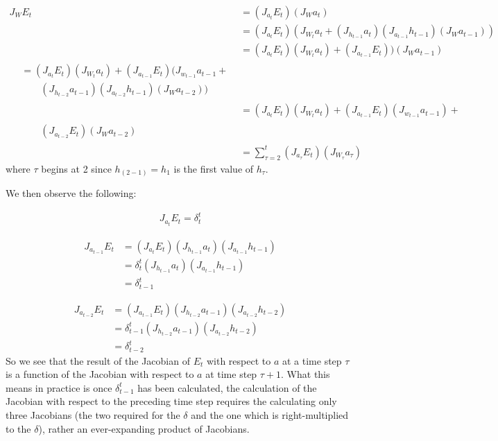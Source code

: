 \begin{align*}
  J_{W} E_t & = (J_{a_t} E_t)(J_{W} a_t) \\
  & = (J_{a_t} E_t)(J_{W_t} a_t + (J_{h_{t-1}} a_t)(J_{a_{t-1}} h_{t-1})(J_{W}a_{t-1})) \\
  & = (J_{a_t} E_t)(J_{W_t} a_t) + (J_{a_{t-1}} E_t))(J_{W}a_{t-1}) \\
  \begin{split}
    & = (J_{a_t} E_t)(J_{W_t} a_t) + (J_{a_{t-1}} E_t)(J_{w_{t-1}} a_{t-1} + \\
    & \qquad (J_{h_{t-2}} a_{t-1})(J_{a_{t-2}} h_{t-1})(J_{W}a_{t-2}))
  \end{split} \\
  & = (J_{a_t} E_t)(J_{W_t} a_t) + (J_{a_{t-1}} E_t)(J_{w_{t-1}} a_{t-1}) + \\
  \begin{split}
    & \qquad (J_{a_{t-2}} E_t)(J_W a_{t-2})
  \end{split} \\
  & = \sum_{\tau=2}^{t}  (J_{a_\tau} E_t)(J_{W_\tau} a_\tau)
\end{align*}
%
where $\tau$ begins at 2 since $h_{(2-1)} = h_1$ is the first value of $h_\tau$.

We then observe the following:

\begin{align*}
  J_{a_t} E_t = \delta_{t}^t
\end{align*}

\begin{align*}
  J_{a_{t-1}} E_t & = (J_{a_t} E_t)(J_{h_{t-1}} a_t)(J_{a_{t-1}} h_{t-1}) \\
  & = \delta_{t}^t (J_{h_{t-1}} a_{t})(J_{a_{t-1}} h_{t-1}) \\
  & = \delta_{t-1}^t
\end{align*}

\begin{align*}
  J_{a_{t-2}} E_t & = (J_{a_{t-1}} E_t)(J_{h_{t-2}} a_{t-1})(J_{a_{t-2}} h_{t-2}) \\
  & = \delta_{t-1}^t (J_{h_{t-2}} a_{t-1})(J_{a_{t-2}} h_{t-2}) \\
  & = \delta_{t-2}^t
\end{align*}
%
So we see that the result of the Jacobian of $E_t$ with respect to $a$ at a time step $\tau$ is a function of the Jacobian with respect to $a$ at time step $\tau + 1$. What this means in practice is once $\delta_{t-1}^t$ has been calculated, the calculation of the Jacobian with respect to the preceding time step requires the calculating only three Jacobians (the two required for the $\delta$ and the one which is right-multiplied to the $\delta$), rather an ever-expanding product of Jacobians.

